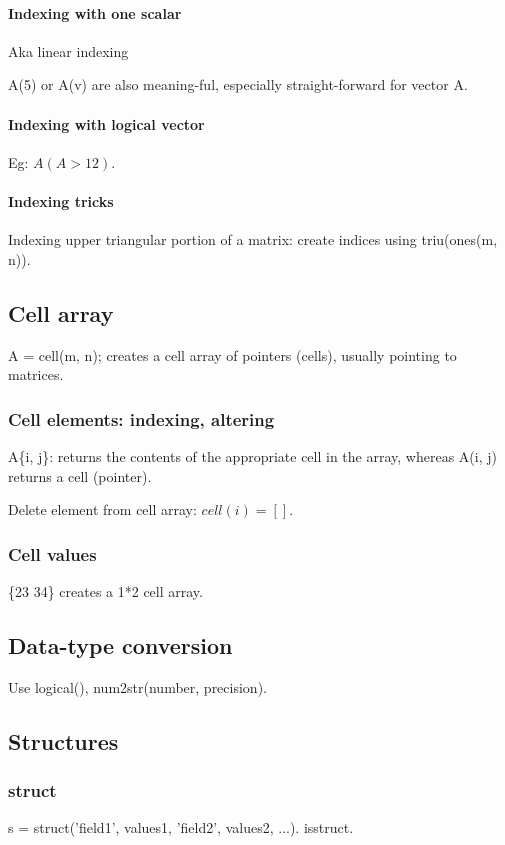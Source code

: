 \paragraph*{Indexing with one scalar}
Aka linear indexing

A(5) or A(v) are also meaning-ful, especially straight-forward for vector A.

\paragraph*{Indexing with logical vector}
Eg: $A(A>12)$.

\paragraph*{Indexing tricks}
Indexing upper triangular portion of a matrix: create indices using triu(ones(m, n)).

\subsection{Cell array}
A = cell(m, n); creates a cell array of pointers (cells), usually pointing to matrices.

\subsubsection{Cell elements: indexing, altering}
A\{i, j\}: returns the contents of the appropriate cell in the array, whereas A(i, j) returns a cell (pointer).

Delete element from cell array: $cell(i) = []$.


\subsubsection{Cell values}
\{23 34\} creates a 1*2 cell array.

\subsection{Data-type conversion}
Use logical(), num2str(number, precision).

\subsection{Structures}
\subsubsection{struct}
s = struct('field1', values1, 'field2', values2, ...). isstruct.

